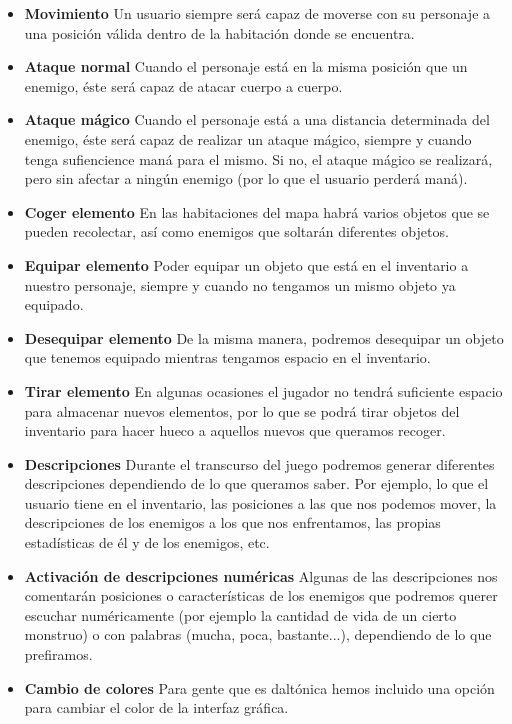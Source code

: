 \begin{itemize}
  \item \textbf{Movimiento} Un usuario siempre será capaz de moverse con su personaje a una posición válida dentro de la habitación donde se encuentra. 
  \item \textbf{Ataque normal} Cuando el personaje está en la misma posición que un enemigo, éste será capaz de atacar cuerpo a cuerpo.
  \item \textbf{Ataque mágico} Cuando el personaje está a una distancia determinada del enemigo, éste será capaz de realizar un ataque mágico, siempre y cuando tenga sufiencience maná para el mismo. Si no, el ataque mágico se realizará, pero sin afectar a ningún enemigo (por lo que el usuario perderá maná).
  \item \textbf{Coger elemento} En las habitaciones del mapa habrá varios objetos que se pueden recolectar, así como enemigos que soltarán diferentes objetos.
  \item \textbf{Equipar elemento} Poder equipar un objeto que está en el inventario a nuestro personaje, siempre y cuando no tengamos un mismo objeto ya equipado.
  \item \textbf{Desequipar elemento} De la misma manera, podremos desequipar un objeto que tenemos equipado mientras tengamos espacio en el inventario.
  \item \textbf{Tirar elemento} En algunas ocasiones el jugador no tendrá suficiente espacio para almacenar nuevos elementos, por lo que se podrá tirar objetos del inventario para hacer hueco a aquellos nuevos que queramos recoger.
  \item \textbf{Descripciones} Durante el transcurso del juego podremos generar diferentes descripciones dependiendo de lo que queramos saber. Por ejemplo, lo que el usuario tiene en el inventario, las posiciones a las que nos podemos mover, la descripciones de los enemigos a los que nos enfrentamos, las propias estadísticas de él y de los enemigos, etc.
  \item \textbf{Activación de descripciones numéricas} Algunas de las descripciones nos comentarán posiciones o características de los enemigos que podremos querer escuchar numéricamente (por ejemplo la cantidad de vida de un cierto monstruo) o con palabras (mucha, poca, bastante...), dependiendo de lo que prefiramos.
  \item \textbf{Cambio de colores} Para gente que es daltónica hemos incluido una opción para cambiar el color de la interfaz gráfica.
\end{itemize}

